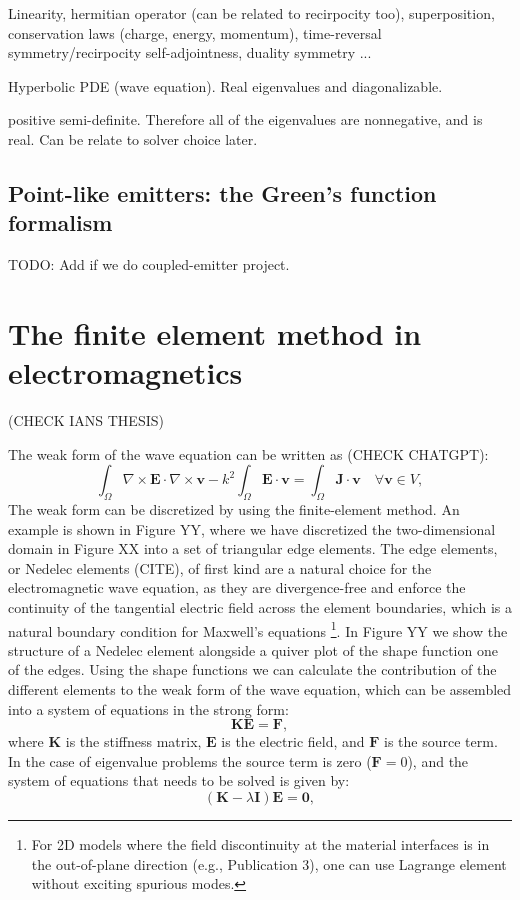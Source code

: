 Linearity, hermitian operator (can be related to recirpocity too), superposition, 
conservation laws (charge, energy, momentum), time-reversal symmetry/recirpocity
self-adjointness, duality symmetry ...

Hyperbolic PDE (wave equation). Real eigenvalues and diagonalizable.

positive semi-definite. Therefore all of the eigenvalues are nonnegative, and is real. Can
be relate to solver choice later.

\subsection*{Point-like emitters: the Green's function formalism}

TODO: Add if we do coupled-emitter project.

\section{The finite element method in electromagnetics}

(CHECK IANS THESIS)

The weak form of the wave equation can be written as (CHECK CHATGPT):
\begin{equation}
    \int_{\Omega} \nabla \times \mathbf{E} \cdot \nabla \times \mathbf{v} - k^2 \int_{\Omega} \mathbf{E} \cdot \mathbf{v} = \int_{\Omega} \mathbf{J} \cdot \mathbf{v} \quad \forall \mathbf{v} \in V,
\end{equation}
The weak form can be discretized by using the finite-element method. An example is shown in Figure YY, 
where we have discretized the two-dimensional domain in Figure XX into a set of triangular edge elements. 
The edge elements, or Nedelec elements (CITE), of first kind are a natural choice for the electromagnetic 
wave equation, as they are divergence-free and enforce the continuity of the tangential electric field 
across the element boundaries, which is a natural boundary condition for Maxwell's equations 
\footnote{For 2D models where the field discontinuity at the material interfaces 
is in the out-of-plane direction (e.g., Publication 3), one can use Lagrange element without 
exciting spurious modes.}. In Figure YY
we show the structure of a Nedelec element alongside a quiver plot of the shape function one of the edges.
Using the shape functions we can calculate the contribution of the different elements to the weak form of the
wave equation, which can be assembled into a system of equations in the strong form:
\begin{equation}
    \mathbf{K} \mathbf{E} = \mathbf{F},
\end{equation}
where $\mathbf{K}$ is the stiffness matrix, $\mathbf{E}$ is the electric field, and $\mathbf{F}$ is the source
 term. In the case of eigenvalue problems the source term is zero ($\mathbf{F}=0$), and the system of equations 
that needs to be solved is given by:
\begin{equation}
    \left(\mathbf{K} - \lambda \mathbf{I} \right) \mathbf{E} =  \mathbf{0},
\end{equation}

